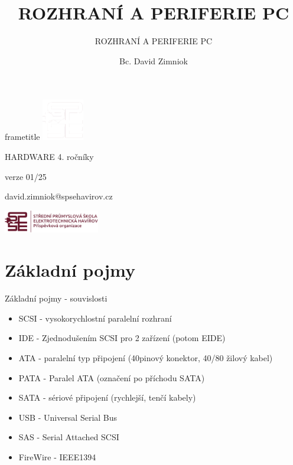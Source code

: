 \documentclass[aspectratio=43]{beamer}
\title{ROZHRANÍ A PERIFERIE PC}
\subtitle{ROZHRANÍ A PERIFERIE PC}
\author{Bc. David Zimniok}
\date{}
\begin{document}
\begin{frame}[plain]
    \vspace*{-0.5cm}
    \begin{beamercolorbox}[wd=\paperwidth,ht=2cm]{frametitle}
        \hspace*{0.5cm}\includegraphics[height=1.8cm]{logo_w.png}
    \end{beamercolorbox}
    \vspace{1cm}
    \begin{flushright}
        {\textbf{\Large \inserttitle} \par}
        \vspace{0.1cm}
        {\large HARDWARE 4. ročníky \par}
        {\large verze 01/25 \par}
        \vspace{1.5cm}
        {\scriptsize \insertauthor \par}
        {\scriptsize david.zimniok@spsehavirov.cz}
    \end{flushright}
    \vspace*{0.5cm}
    \includegraphics[height=1cm]{logo.png}
\end{frame}


\section{Základní pojmy}
\begin{frame}{Základní pojmy - souvislosti}
	\begin{itemize}
		\item SCSI - vysokorychlostní paralelní rozhraní
		\item IDE - Zjednodušením SCSI pro 2 zařízení (potom EIDE)
		\item ATA - paralelní typ připojení (40pinový konektor, 40/80 žilový kabel)
		\item PATA - Paralel ATA (označení po příchodu SATA)
		\item SATA - sériové připojení (rychlejší, tenčí kabely)
		\item USB - Universal Serial Bus
		\item SAS - Serial Attached SCSI
		\item FireWire - IEEE1394
	\end{itemize}
\end{frame}
\end{document}
